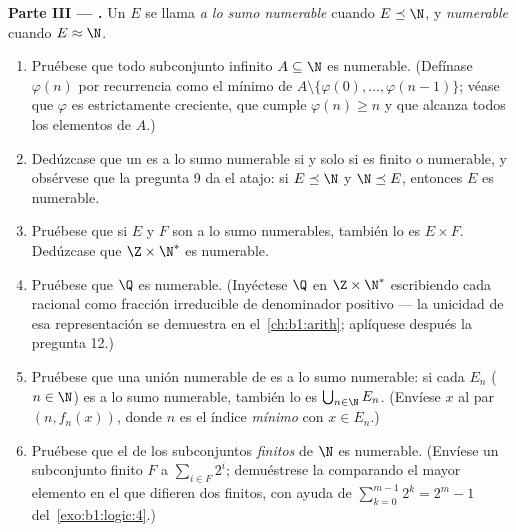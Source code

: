 \begin{problem}
\medskip
\noindent\textbf{Parte III --- .} Un  $E$ se
llama \emph{a lo sumo numerable} cuando $E \preceq \N$, y
\emph{numerable} cuando $E \approx \N$.
\begin{enumerate}[resume]
  \item Pruébese que todo subconjunto infinito $A \subseteq \N$ es
        numerable. (Defínase $\varphi(n)$ por recurrencia como el mínimo
        de $A \setminus \{\varphi(0), \dots, \varphi(n-1)\}$; véase que
        $\varphi$ es estrictamente creciente, que cumple
        $\varphi(n) \geq n$ y que alcanza todos los elementos de $A$.)
  \item Dedúzcase que un  es a lo sumo numerable si y solo si
        es finito o numerable, y obsérvese que la pregunta 9 da el
        atajo: si $E \preceq \N$ y $\N \preceq E$, entonces $E$ es
        numerable.
  \item Pruébese que si $E$ y $F$ son a lo sumo numerables, también lo
        es $E \times F$. Dedúzcase que $\Z \times \N^*$ es numerable.
  \item Pruébese que $\Q$ es numerable. (Inyéctese $\Q$ en $\Z \times
        \N^*$ escribiendo cada racional como fracción irreducible de
        denominador positivo --- la unicidad de esa representación se
        demuestra en el~\cref{ch:b1:arith}; aplíquese después la pregunta 12.)
  \item Pruébese que una unión numerable de  es a
        lo sumo numerable: si cada $E_n$ ($n \in \N$) es a lo sumo
        numerable, también lo es $\bigcup_{n \in \N} E_n$. (Envíese $x$
        al par $(n, f_n(x))$, donde $n$ es el índice \emph{mínimo} con
        $x \in E_n$.)
  \item Pruébese que el  de los subconjuntos \emph{finitos} de
        $\N$ es numerable. (Envíese un subconjunto finito $F$ a
        $\sum_{i \in F} 2^i$; demuéstrese la  comparando el
        mayor elemento en el que difieren dos  finitos, con
        ayuda de $\sum_{k=0}^{m-1} 2^k = 2^m - 1$
        del~\cref{exo:b1:logic:4}.)
\end{enumerate}


\end{problem}
